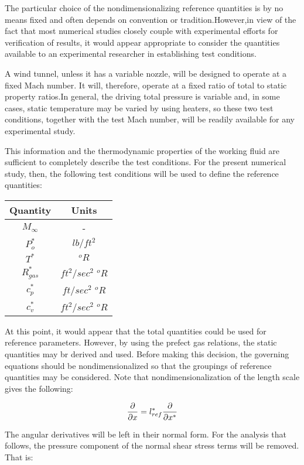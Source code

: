 The particular choice of the nondimensionalizing reference quantities is by no
means fixed and often depends on convention or tradition.However,in view of the
fact that most numerical studies closely couple with experimental efforts for
verification of results, it would appear appropriate to consider the quantities
available to an experimental researcher in establishing test conditions.

A wind tunnel, unless it has a variable nozzle, will be designed to operate at
a fixed Mach number. It will, therefore, operate at a fixed ratio of total to
static property ratios.In general, the driving total pressure is variable and,
in some cases, static temperature may be varied by using heaters, so these two
test conditions, together with the test Mach number, will be readily available
for any experimental study.

This information and the thermodynamic properties of the working fluid are
sufficient to completely describe the test conditions. For the present
numerical study, then, the following test conditions will be used to define the
reference quantities:

\begin{center}
\begin{tabular}{ c c }
Quantity & Units \\
\hline
$M_\infty$ & - \\ 
$P^*_o$ & $lb/ft^2$ \\
$T^*$ & $^oR$ \\
$R^*_{gas}$ & $ft^2/sec^2$ $^oR$ \\
$c_p^*$ & $ft/sec^2$ $^oR$ \\
$c_v^*$ & $ft^2/sec^2$ $^oR$
\end{tabular}
\end{center}

At this point, it would appear that the total quantities could be used for
reference parameters. However, by using the prefect gas relations, the static
quantities may br derived and used. Before making this decision, the governing
equations should be nondimensionalized so that the groupings of reference
quantities may be considered. Note that nondimensionalization of the length
scale gives the following:

\begin{equation}
\pdv{x} = l^*_{ref} \pdv{x^*}
\end{equation}

The angular derivatives will be left in their normal form. For the analysis
that follows, the pressure component of the normal shear stress terms will be
removed. That is:

